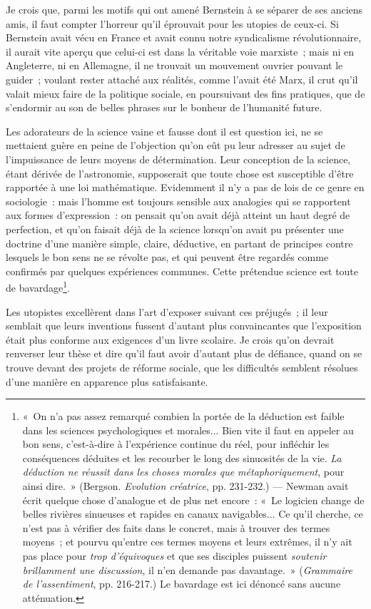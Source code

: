 \documentclass[french,twoside]{book} %
\begin{document}
Je crois que, parmi les motifs qui ont amené Bernstein à se séparer de ses anciens amis, il faut compter l’horreur qu’il éprouvait pour les utopies de ceux-ci. Si Bernstein avait vécu en France et avait connu notre syndicalisme révolutionnaire, il aurait vite aperçu que celui-ci est dans la véritable voie marxiste ; mais ni en Angleterre, ni en Allemagne, il ne trouvait un mouvement ouvrier pouvant le guider ; voulant rester attaché aux réalités, comme l’avait été Marx, il crut qu’il valait mieux faire de la politique sociale, en poursuivant  des fins pratiques, que de s’endormir au son de belles phrases sur le bonheur de l’humanité future.\par
Les adorateurs de la science vaine et fausse dont il est question ici, ne se mettaient guère en peine de l’objection qu’on eût pu leur adresser au sujet de l’impuissance de leurs moyens de détermination. Leur conception de la science, étant dérivée de l’astronomie, supposerait que toute chose est susceptible d’être rapportée à une loi mathématique. Evidemment il n’y a pas de lois de ce genre en sociologie : mais l’homme est toujours sensible aux analogies qui se rapportent aux formes d’expression : on pensait qu’on avait déjà atteint un haut degré de perfection, et qu’on faisait déjà de la science lorsqu’on avait pu présenter une doctrine d’une manière simple, claire, déductive, en partant de principes contre lesquels le bon sens ne se révolte pas, et qui peuvent être regardés comme confirmés par quelques expériences communes. Cette prétendue science est toute de bavardage\footnote{ \noindent « On n’a pas assez remarqué combien la portée de la déduction est faible dans les sciences psychologiques et morales... Bien vite il faut en appeler au bon sens, c’est-à-dire à l’expérience continue du réel, pour infléchir les conséquences déduites et les recourber le long des sinuosités de la vie. \emph{La déduction ne réussit dans les choses morales que métaphoriquement}, pour ainsi dire. » (Bergson. \emph{Evolution créatrice}, pp. 231-232.) — Newman avait écrit quelque chose d’analogue et de plus net encore : « Le logicien change de belles rivières sinueuses et rapides en canaux navigables... Ce qu’il cherche, ce n’est pas à vérifier des faits dans le concret, mais à trouver des termes moyens ; et pourvu qu’entre ces termes moyens et leurs extrêmes, il n’y ait pas place pour \emph{trop d’équivoques} et que ses disciples puissent \emph{soutenir brillamment une discussion}, il n’en demande pas davantage. » (\emph{Grammaire de l’assentiment}, pp. 216-217.) Le bavardage est ici dénoncé sans aucune atténuation.
 }.\par
 Les utopistes excellèrent dans l’art d’exposer suivant ces préjugés ; il leur semblait que leurs inventions fussent d’autant plus convaincantes que l’exposition était plus conforme aux exigences d’un livre scolaire. Je crois qu’on devrait renverser leur thèse et dire qu’il faut avoir d’autant plus de défiance, quand on se trouve devant des projets de réforme sociale, que les difficultés semblent résolues d’une manière en apparence plus satisfaisante.\par
\end{document}
